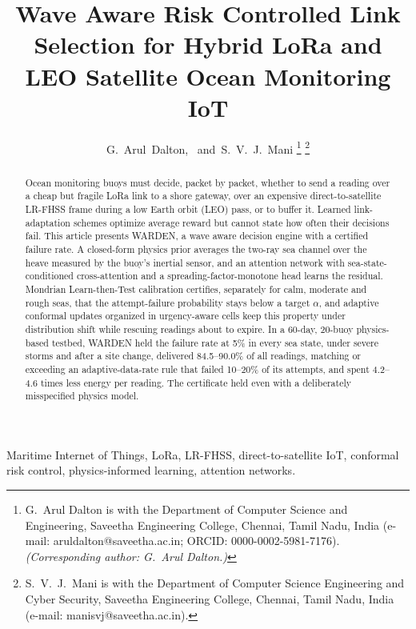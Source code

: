 \documentclass[journal]{IEEEtran}\def\WARDENieee{1}%
\begin{document}
\title{Wave Aware Risk Controlled Link Selection for Hybrid LoRa and LEO Satellite Ocean Monitoring IoT}

\author{G.~Arul~Dalton,~ and~S.~V.~J.~Mani%
\thanks{G.~Arul Dalton is with the Department of Computer Science and Engineering, Saveetha Engineering College, Chennai, Tamil Nadu, India (e-mail: aruldalton@saveetha.ac.in; ORCID: 0000-0002-5981-7176). \emph{(Corresponding author: G.~Arul Dalton.)}}%
\thanks{S.~V.~J.~Mani is with the Department of Computer Science Engineering and Cyber Security, Saveetha Engineering College, Chennai, Tamil Nadu, India (e-mail: manisvj@saveetha.ac.in).}}

\maketitle

\begin{abstract}
Ocean monitoring buoys must decide, packet by packet, whether to send a reading over a cheap but fragile LoRa link to a shore gateway, over an expensive direct-to-satellite LR-FHSS frame during a low Earth orbit (LEO) pass, or to buffer it. Learned link-adaptation schemes optimize average reward but cannot state how often their decisions fail. This article presents WARDEN, a wave aware decision engine with a certified failure rate. A closed-form physics prior averages the two-ray sea channel over the heave measured by the buoy's inertial sensor, and an attention network with sea-state-conditioned cross-attention and a spreading-factor-monotone head learns the residual. Mondrian Learn-then-Test calibration certifies, separately for calm, moderate and rough seas, that the attempt-failure probability stays below a target $\alpha$, and adaptive conformal updates organized in urgency-aware cells keep this property under distribution shift while rescuing readings about to expire. In a 60-day, 20-buoy physics-based testbed, WARDEN held the failure rate at 5\% in every sea state, under severe storms and after a site change, delivered 84.5--90.0\% of all readings, matching or exceeding an adaptive-data-rate rule that failed 10--20\% of its attempts, and spent 4.2--4.6 times less energy per reading. The certificate held even with a deliberately misspecified physics model.
\end{abstract}

\begin{IEEEkeywords}
Maritime Internet of Things, LoRa, LR-FHSS, direct-to-satellite IoT, conformal risk control, physics-informed learning, attention networks.
\end{IEEEkeywords}
\end{document}
